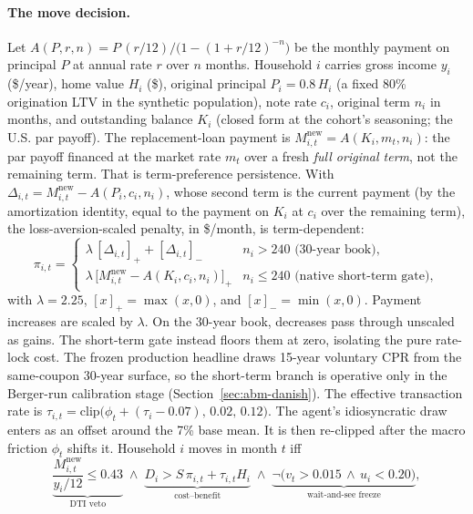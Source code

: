 \documentclass[12pt]{article}
\begin{document}
\paragraph{The move decision.}
Let $A(P,r,n) = P\,(r/12)\big/\big(1-(1+r/12)^{-n}\big)$ be the monthly payment on principal $P$ at annual rate $r$ over $n$ months. %
Household $i$ carries gross income $y_i$ (\$/year), home value $H_i$ (\$), original principal $P_i = 0.8\,H_i$ (a fixed 80\% origination LTV in the synthetic population), note rate $c_i$, original term $n_i$ in months, and outstanding balance $K_i$ (closed form at the cohort's seasoning; the U.S. par payoff). %
The replacement-loan payment is $M^{\mathrm{new}}_{i,t} = A(K_i, m_t, n_i)$: the par payoff financed at the market rate $m_t$ over a fresh \emph{full original term}, not the remaining term. That is term-preference persistence. %
With $\Delta_{i,t} = M^{\mathrm{new}}_{i,t} - A(P_i, c_i, n_i)$, whose second term is the current payment (by the amortization identity, equal to the payment on $K_i$ at $c_i$ over the remaining term), the loss-aversion-scaled penalty, in \$/month, is term-dependent:
\begin{equation}\label{eq:abmpenalty}
\pi_{i,t} =
\begin{cases}
\lambda\,[\Delta_{i,t}]_{+} + [\Delta_{i,t}]_{-} & n_i > 240 \text{ (30-year book)},\\
\lambda\,\big[M^{\mathrm{new}}_{i,t} - A(K_i, c_i, n_i)\big]_{+} & n_i \le 240 \text{ (native short-term gate)},
\end{cases}
\end{equation}
with $\lambda = 2.25$, $[x]_{+} = \max(x,0)$, and $[x]_{-} = \min(x,0)$. Payment increases are scaled by $\lambda$. On the 30-year book, decreases pass through unscaled as gains. The short-term gate instead floors them at zero, isolating the pure rate-lock cost. The frozen production headline draws 15-year voluntary CPR from the same-coupon 30-year surface, so the short-term branch is operative only in the Berger-run calibration stage (Section~\ref{sec:abm-danish}).
The effective transaction rate is $\tau_{i,t} = \mathrm{clip}\big(\phi_t + (\tau_i - 0.07),\,0.02,\,0.12\big)$. The agent's idiosyncratic draw enters as an offset around the 7\% base mean. It is then re-clipped after the macro friction $\phi_t$ shifts it. %
Household $i$ moves in month $t$ iff
\begin{equation}\label{eq:abmmove}
\underbrace{\frac{M^{\mathrm{new}}_{i,t}}{y_i/12} \le 0.43}_{\text{DTI veto}}
\;\wedge\;
\underbrace{D_i > S\,\pi_{i,t} + \tau_{i,t} H_i}_{\text{cost--benefit}}
\;\wedge\;
\underbrace{\neg\big(v_t > 0.015 \,\wedge\, u_i < 0.20\big)}_{\text{wait-and-see freeze}},
\end{equation}
\end{document}
